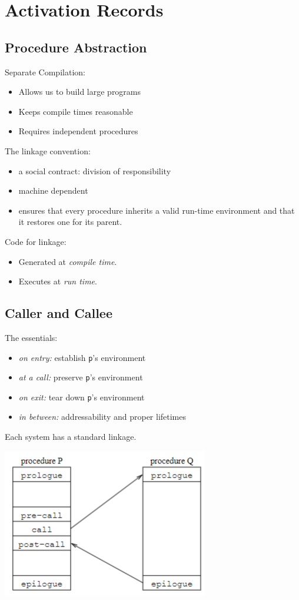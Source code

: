 \documentclass[10pt]{article}
\begin{document}
\section*{Activation Records}
\subsection*{Procedure Abstraction}
Separate Compilation:
\begin{itemize}
    \item Allows us to build large programs
    \item Keeps compile times reasonable
    \item Requires independent procedures
\end{itemize}
The linkage convention:
\begin{itemize}
    \item a social contract: division of responsibility
    \item machine dependent
    \item ensures that every procedure inherits a valid run-time environment and that it restores one for its parent.
\end{itemize}
Code for linkage:
\begin{itemize}
    \item Generated at \textit{compile time}.
    \item Executes at \textit{run time}.
\end{itemize}

\subsection*{Caller and Callee}
The essentials:
\begin{itemize}
    \item \textit{on entry:} establish \texttt{p}'s environment
    \item \textit{at a call:} preserve \texttt{p}'s environment
    \item \textit{on exit:} tear down \texttt{p}'s environment
    \item \textit{in between:} addressability and proper lifetimes
\end{itemize}
Each system has a standard linkage.
\begin{center}
    \includegraphics*[scale=1]{W6_4.png}
\end{center}
\end{document}
